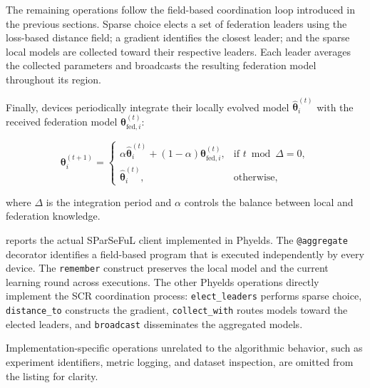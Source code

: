 The remaining operations follow the field-based coordination loop introduced
 in the previous sections.
%
Sparse choice elects a set of federation leaders using the loss-based distance field; 
 a gradient identifies the closest leader; 
 and the sparse local models are collected toward their respective leaders.
%
Each leader averages the collected parameters 
 and broadcasts the resulting federation model throughout its region.

Finally, 
 devices periodically integrate their locally evolved model \(\hat{\boldsymbol{\theta}}_i^{(t)}\) 
 with the received federation model \(\boldsymbol{\theta}_{\mathrm{fed},i}^{(t)}\):

\begin{equation}
  \boldsymbol{\theta}_i^{(t+1)}
  =
  \begin{cases}
    \alpha\hat{\boldsymbol{\theta}}_i^{(t)}
    +
    (1-\alpha)\boldsymbol{\theta}_{\mathrm{fed},i}^{(t)},
      & \text{if } t \bmod \Delta = 0,\\[3pt]
    \hat{\boldsymbol{\theta}}_i^{(t)},
      & \text{otherwise},
  \end{cases}
  \label{eq:sparseful-integration}
\end{equation}

where \(\Delta\) is the integration period 
 and \(\alpha\) controls the balance between local and federation knowledge.


 reports the actual SParSeFuL client implemented in Phyelds.
%
The \texttt{@aggregate} decorator identifies a field-based program 
 that is executed independently by every device.
%
The \texttt{remember} construct preserves the local model 
 and the current learning round across executions.
%
The other Phyelds operations directly implement the SCR coordination process:
 \texttt{elect\_leaders} performs sparse choice,
 \texttt{distance\_to} constructs the gradient,
 \texttt{collect\_with} routes models toward the elected leaders, and
 \texttt{broadcast} disseminates the aggregated models.

Implementation-specific operations unrelated to the algorithmic behavior,
 such as experiment identifiers, metric logging, and dataset inspection, 
 are omitted from the listing for clarity.

